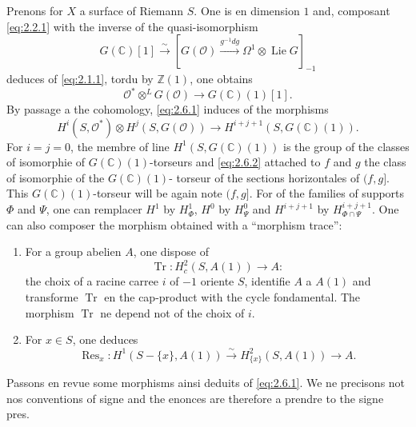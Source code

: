 \documentclass[12pt,a4paper]{article}
\theoremstyle{plain}
\theoremstyle{definition}
\theoremstyle{remark}
\DeclareMathOperator{\Res}{Res}
\DeclareMathOperator{\Tr}{Tr}
\newcommand{\cO}{\mathcal{O}}
\newcommand{\Z}{\mathbb{Z}}
\newcommand{\C}{\mathbb{C}}
\providecommand{\cO}{\mathcal{O}}
\providecommand{\Tr}{\operatorname{Tr}}
\begin{document}
Prenons for $X$ a surface of Riemann $S$. One is en dimension $1$ and, composant \eqref{eq:2.2.1} with the inverse of the quasi-isomorphism
\[
G(\C)[1] \xrightarrow{\sim} [G(\cO) \xrightarrow{g^{-1}dg} \Omega^1 \otimes \operatorname{Lie} G]_{-1}
\]
deduces of \eqref{eq:2.1.1}, tordu by $\Z(1)$, one obtains
\begin{equation}\label{eq:2.6.1}
\cO^* \otimes^L G(\cO) \to G(\C)(1)[1].
\end{equation}
By passage a the cohomology, \eqref{eq:2.6.1} induces of the morphisms
\begin{equation}\label{eq:2.6.2}
H^i(S, \cO^*) \otimes H^j(S, G(\cO)) \to H^{i+j+1}(S, G(\C)(1)).
\end{equation}
For $i = j = 0$, the membre of line $H^1(S, G(\C)(1))$ is the group of the classes of isomorphie
of $G(\C)(1)$-torseurs and \eqref{eq:2.6.2} attached to $f$ and $g$ the class of isomorphie of the $G(\C)(1)$-
torseur of the sections horizontales of $(f,g]$. This $G(\C)(1)$-torseur will be again note $(f,g]$.
For of the families of supports $\Phi$ and $\Psi$, one can remplacer $H^1$ by $H^1_\Phi$, $H^0$ by $H^0_\Psi$
and $H^{i+j+1}$ by $H^{i+j+1}_{\Phi \cap \Psi}$. One can also composer the morphism obtained with a ``morphism trace'':

\begin{enumerate}[label=(\Alph*)]
\item For a group abelien $A$, one dispose of
\begin{equation}\label{eq:2.6.3}
\Tr : H^2_c(S, A(1)) \to A :
\end{equation}
the choix of a racine carree $i$ of $-1$ oriente $S$, identifie $A$ a $A(1)$ and transforme $\Tr$
en the cap-product with the cycle fondamental. The morphism $\Tr$ ne depend not of the
choix of $i$.

\item For $x \in S$, one deduces
\begin{equation}\label{eq:2.6.4}
\Res_x : H^1(S - \{x\}, A(1)) \xrightarrow{\sim} H^2_{\{x\}}(S, A(1)) \to A.
\end{equation}
\end{enumerate}

Passons en revue some morphisms ainsi deduits of \eqref{eq:2.6.1}. We ne precisons
not nos conventions of signe and the enonces are therefore a prendre to the signe pres.

\subsection{}
\end{document}
